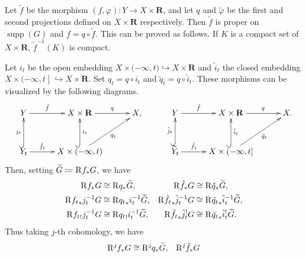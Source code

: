 ﻿\documentclass[a4paper,leqno]{jsarticle}
\makeatletter
\theoremstyle{definition}
\newcommand{\rr}{\mathbf{R}}
\renewenvironment{proof}[1][\proofname]{\par
  \pushQED{\qed}%
  \normalfont \topsep6\p@\@plus6\p@\relax
  \trivlist
  \item[\hskip\labelsep
         \bfseries
    {#1}]\ignorespaces
}{%
  \popQED\endtrivlist\@endpefalse
}
\renewcommand{\proofname}{Proof.}
\numberwithin{equation}{section}
\newcommand{\supp}{\mathop{\mathrm{supp}}\nolimits}
\newcommand{\Rder}[1][]{\mathop{\mathrm{R}^{#1}\hspace{-2pt}}\nolimits}
\theoremstyle{mystyle}
\newcommand{\lopen}{\mathopen{(}}
\newcommand{\ropen}{\mathclose{)}}
\newcommand{\rclosed}{\mathopen{]}}
\makeatother
\begin{document}
\begin{proof}
  Let \(\tilde{f}\) be the morphism \(
    (f,\varphi)\colon Y\to X\times \rr
  \), and let \(q\) and \(\tilde{\varphi}\) be 
  the first and second projections 
  defined on \(X\times \rr\) respectively. 
  Then \(\tilde{f}\) is proper on \(\supp(G)\) and 
  \(f=q\circ \tilde{f}\). 
  This can be proved as follows. 
  If \(K\) is a compact set of \(X\times \rr\), 
  \(\tilde{f}^{-1}(K)\) is compact.
  
  Let \(i_t\) be the open embedding \(
    X\times\lopen -\infty, t\ropen\hookrightarrow X\times \rr
  \) and \(\tilde{i}_t\) the closed embedding \(
    X\times\lopen -\infty, t\rclosed\hookrightarrow X\times \rr
  \). Set \(q_t=q\circ i_t\) and \(\tilde{q}_t=q\circ\tilde{i}_t\). 
  These morphisms can be visualized by the following diagrams.
  \[\vcenter{\xymatrix@C=30pt@R=30pt{
    Y
      \ar[r]^-{\tilde{f}}
    &
    X\times\rr
      \ar[r]^-{q}
    &
    X,
    &
    Y
      \ar[r]^-{\tilde{f}}
    &
    X\times\rr
      \ar[r]^-{q}
    &
    X.\\
    Y_{t}
      \ar@{^(->}[u]^-{j_t}
      \ar[r]^-{\hat{f}_{t}}
    &
    X\times \lopen-\infty,t\ropen
      \ar@{^(->}[u]_-{i_{t}}
      \ar[ur]_-{q_{t}}
    &
    &
    \widetilde{Y}_{t}
      \ar@{^(->}[u]^-{\tilde{j}_t}
      \ar[r]^-{\check{f}_{t}}
    &
    X\times \lopen-\infty,t\rclosed
      \ar@{^(->}[u]_-{\tilde{i}_{t}}
      \ar[ur]_-{\tilde{q}_{t}}
    &
  }}\]
  Then, setting \(\widetilde{G}\coloneqq \Rder[]{f_{\ast}}G\), 
  we have \begin{align*}
    \Rder[]{f_{\ast}}G
    &\cong 
    \Rder[]{q_{\ast}}\widetilde{G},
    &
    \Rder[]{\tilde{f}_{\ast}}G
    &\cong 
    \Rder[]{\tilde{q}_{\ast}}\widetilde{G},
    \\
    \Rder[]{{f_{t}}_{\ast}}j_{t}^{-1}G
    &\cong 
    \Rder[]{{q_{t}}_{\ast}}i_{t}^{-1}\widetilde{G},
    &
    \Rder[]{\tilde{f_{t}}_{\ast}}\tilde{j}_{t}^{-1}G
    &\cong 
    \Rder[]{\tilde{q_{t}}_{\ast}}\tilde{i}_{t}^{-1}\widetilde{G},
    \\
    \Rder[]{{f_{t}}_{!}}j_{t}^{-1}G
    &\cong 
    \Rder[]{{q_{t}}_{!}}i_{t}^{-1}\widetilde{G},
    &
    \Rder[]{\tilde{f_{t}}_{\ast}}\tilde{j}_{t}^{!}G
    &\cong 
    \Rder[]{\tilde{q_{t}}_{\ast}}\tilde{i}_{t}^{!}\widetilde{G}.
  \end{align*}
  Thus taking \(j\)-th cohomology, we have\begin{align*}
    \Rder[j]{f_{\ast}}G
    &\cong 
    \Rder[j]{q_{\ast}}\widetilde{G},
    &
    \Rder[j]{\tilde{f}_{\ast}}G

\end{align*}
\end{proof}
\end{document}
